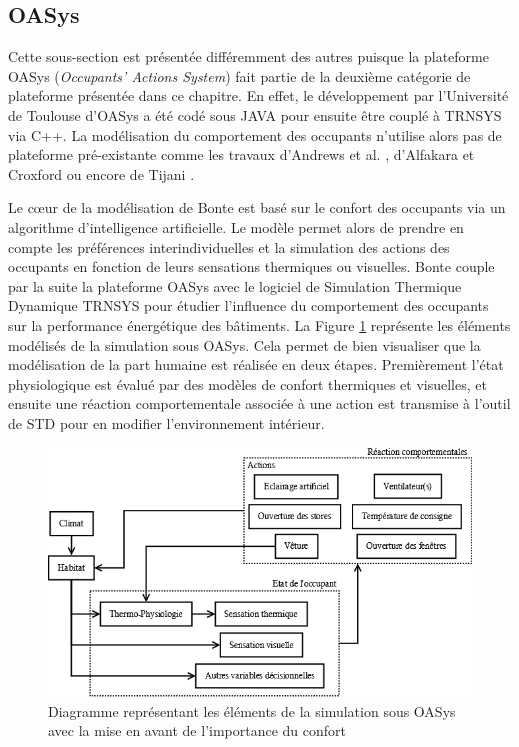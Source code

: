 \subsection{OASys}

Cette sous-section est présentée différemment des autres puisque la plateforme OASys (\textit{Occupants’ Actions System}) fait partie de la deuxième catégorie de plateforme présentée dans ce chapitre. En effet, le développement par l'Université de Toulouse d'OASys a été codé sous JAVA pour ensuite être couplé à TRNSYS via C++. La modélisation du comportement des occupants n'utilise alors pas de plateforme pré-existante comme les travaux d'Andrews et al. \cite{Andrews-11}, d'Alfakara et Croxford \cite{Alfakara-14} ou encore de Tijani \cite{Tijani-14}.

Le cœur de la modélisation de Bonte \cite{Bonte-14} est basé sur le confort des occupants via un algorithme d'intelligence artificielle. Le modèle permet alors de prendre en compte les préférences interindividuelles et la simulation des actions des occupants en fonction de leurs sensations thermiques ou visuelles. Bonte couple par la suite la plateforme OASys avec le logiciel de Simulation Thermique Dynamique TRNSYS pour étudier l'influence du comportement des occupants sur la performance énergétique des bâtiments. La Figure \ref{fig:Diagramme_OASys} représente les éléments modélisés de la simulation sous OASys. Cela permet de bien visualiser que la modélisation de la part humaine est réalisée en deux étapes. Premièrement l'état physiologique est évalué par des modèles de confort thermiques et visuelles, et ensuite une réaction comportementale associée à une action est transmise à l'outil de STD pour en modifier l'environnement intérieur.

\begin{figure}[H]
\centering
\includegraphics[scale=0.4]{Images/diagrammes_SMA/OASys}
\caption{Diagramme représentant les éléments de la simulation sous OASys avec la mise en avant de l'importance du confort}
\label{fig:Diagramme_OASys}
\end{figure}


